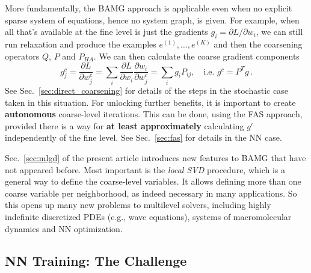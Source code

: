 \documentclass{article} %
\begin{document}
More fundamentally, the BAMG approach is applicable even when no explicit sparse system of equations, hence no system graph, is given. For example, when all that's available at the fine level is just the gradients $g_i = \partial L/\partial w_i$, we can still run relaxation and produce the examples $e^{(1)},\dots,e^{(K)}$ and then the coarsening operators $Q$, $P$ and $P_{HA}$. We can then calculate the coarse gradient components
$$
	g^c_j = \frac{\partial L}{\partial w^c_j} =
	\sum_i \frac{\partial L}{\partial w_i} \frac{\partial w_i}{\partial w_j^c} =
	\sum_i g_i P_{ij}, \quad {\mbox{i.e. }} g^c = P^T g\,.
$$
See Sec.~\ref{sec:direct_coarsening} for details of the steps in the stochastic case taken in this situation. For unlocking further benefits, it is important to create \textbf{autonomous} coarse-level iterations. This can be done, using the FAS approach, provided there is a way for \textbf{at least approximately} calculating $g^c$ independently of the fine level. See Sec.~\ref{sec:fas} for details in the NN case.

Sec.~\ref{sec:mlgd} of the present article introduces new features to BAMG that have not appeared before. Most important is the {\it local SVD} procedure, which is a general way to define the coarse-level variables. It allows defining more than one coarse variable per neighborhood, as indeed necessary in many applications. So this opens up many new problems to multilevel solvers, including highly indefinite discretized PDEs (e.g., wave equations), systems of macromolecular dynamics and NN optimization.

\subsection{NN Training: The Challenge}
\label{sec:6.1}
\end{document}
